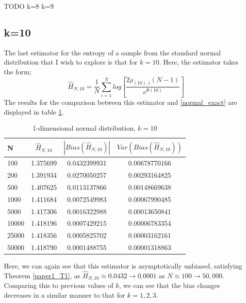 \documentclass{report}
\begin{document}
TODO 
k=8
k=9





\subsection{k=10} \label{N_k=10}
The last estimator for the entropy of a sample from the standard normal distribution that I wish to explore is that for $k=10$. Here, the estimator takes the form;
\begin{equation}
\hat{H}_{N, 10} = \frac{1}{N} \sum_{i=1}^{N} log \left[ \frac{2\rho_{(10),i}(N-1)}{e^{\Psi(10)}} \right] \nonumber
\end{equation}
The results for the comparison between this estimator and \ref{normal_exact} are displayed in table \ref{normal_k=10_table}.

\begin{table}
\caption{1-dimensional normal distribution, $k=10$} \label{normal_k=10_table}
\begin{center}
\begin{tabular}{| l | c c c|} 
\toprule
N & $\hat{H}_{N, 10}$ & $|Bias(\hat{H}_{N, 10})|$ & $Var(Bias(\hat{H}_{N, 10}))$ \\
\midrule[1pt]
100     & 1.375699     & 0.0432399931     & 0.00678770166  \\
200     & 1.391934     & 0.0270050257     & 0.00293164825  \\
500     & 1.407625     & 0.0113137866     & 0.00148669638  \\
1000    & 1.411684     & 0.0072549983     & 0.00067990485  \\
5000    & 1.417306     & 0.0016322988     & 0.00013650841  \\
10000   & 1.418196     & 0.0007429215     & 0.00006783354  \\
25000   & 1.418356     & 0.0005825702     & 0.00003162161  \\
50000   & 1.418790     & 0.0001488755     & 0.00001318863  \\
\hline
\end{tabular}
\end{center}
\end{table}

Here, we can again see that this estimator is asymptotically unbiased, satisfying Theorem \ref{paper1_T1}, as $\hat{H}_{N, 10} \approx  0.0432 \to 0.0001$ as $N \approx 100 \to 50,000$. Comparing this to previous values of $k$, we can see that the bias changes decreases in a similar manner to that for $k=1, 2, 3$.
\end{document}
